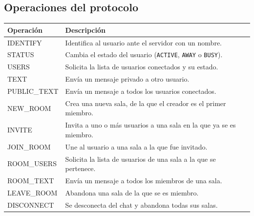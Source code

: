\documentclass[12pt,a4paper]{article}
\begin{document}
\subsection{Operaciones del protocolo}
\begin{table}[H]
    \centering
    \begin{tabular}{@{}ll@{}}
        \toprule
        \textbf{Operación} & \textbf{Descripción} \\
        \midrule
        IDENTIFY & Identifica al usuario ante el servidor con un nombre. \\
        STATUS & Cambia el estado del usuario (\texttt{ACTIVE}, \texttt{AWAY} o \texttt{BUSY}). \\
        USERS & Solicita la lista de usuarios conectados y su estado. \\
        TEXT & Envía un mensaje privado a otro usuario. \\
        PUBLIC\_TEXT & Envía un mensaje a todos los usuarios conectados. \\
        NEW\_ROOM & Crea una nueva sala, de la que el creador es el primer miembro. \\
        INVITE & Invita a uno o más usuarios a una sala en la que ya se es miembro. \\
        JOIN\_ROOM & Une al usuario a una sala a la que fue invitado. \\
        ROOM\_USERS & Solicita la lista de usuarios de una sala a la que se pertenece. \\
        ROOM\_TEXT & Envía un mensaje a todos los miembros de una sala. \\
        LEAVE\_ROOM & Abandona una sala de la que se es miembro. \\
        DISCONNECT & Se desconecta del chat y abandona todas sus salas. \\
        \bottomrule
    \end{tabular}
    \label{tab:operaciones}
\end{table}
\end{document}
